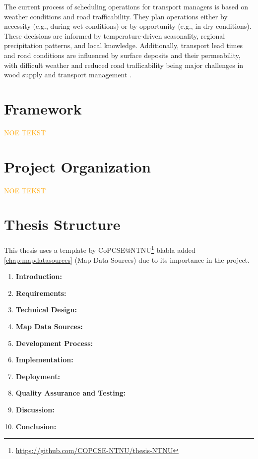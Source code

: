 The current process of scheduling operations for transport managers is based on weather conditions and road \gls{trafficability}. They plan operations either by necessity (e.g., during wet conditions) or by opportunity (e.g., in dry conditions). These decisions are informed by temperature-driven seasonality, regional precipitation patterns, and local knowledge. Additionally, transport lead times and road conditions are influenced by surface deposits and their \gls{permeability}, with difficult weather and reduced road \gls{trafficability} being major challenges in wood supply and transport management \cite{fjeld2023trafficability}. 

\section{Framework}

\textcolor{orange}{NOE TEKST}

\section{Project Organization}

\textcolor{orange}{NOE TEKST}

\section{Thesis Structure}

This thesis uses a template by CoPCSE@NTNU\footnote{\url{https://github.com/COPCSE-NTNU/thesis-NTNU}} blabla added \autoref{chap:mapdatasources} (Map Data Sources) due to its importance in the project.

\begin{enumerate}
    \item \textbf{Introduction:}
    \item \textbf{Requirements:}
    \item \textbf{Technical Design:}
    \item \textbf{Map Data Sources:}
    \item \textbf{Development Process:}
    \item \textbf{Implementation:}
    \item \textbf{Deployment:}
    \item \textbf{Quality Assurance and Testing:}
    \item \textbf{Discussion:}
    \item \textbf{Conclusion:}
\end{enumerate}
